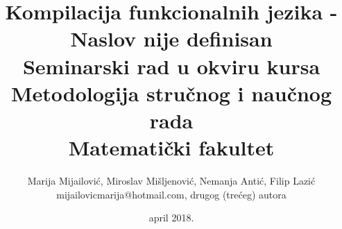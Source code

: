 \documentclass[a4paper]{article}
\begin{document}
\title{Kompilacija funkcionalnih jezika - Naslov nije definisan\\ \small{Seminarski rad u okviru kursa\\Metodologija stručnog i naučnog rada\\ Matematički fakultet}}

\author{Marija Mijailović, Miroslav Mišljenović, Nemanja Antić, Filip Lazić\\ mijailovicmarija@hotmail.com, drugog (trećeg) autora}
\date{april 2018.}
\maketitle



\setcounter{tocdepth}{1}
\tableofcontents

\newpage








\appendix
 


\appendix

\end{document}

